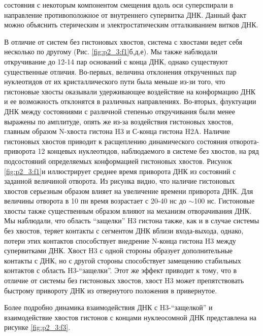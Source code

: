 состояния с некоторым компонентом смещения вдоль оси суперспирали в направление противоположное от внутреннего супервитка ДНК. Данный факт можно объяснить стерическим и электростатическим отталкиванием витков ДНК.

В отличие от систем без гистоновых хвостов, система с хвостами ведет себя несколько по другому (Рис. \ref{fig:p2_3:f1}б,д,е). Мы также наблюдали откручивание до 12-14 пар оснований с конца ДНК, однако существуют существенные отличия. Во-первых, величина отклонения открученных пар нуклеотидов от их кристаллического пути была меньше из-зи того, что гистоновые хвосты оказывали удерживающее воздействие на конформацию ДНК и ее возможность отклонятся в различных направлениях. Во-вторых, флуктуации ДНК между состояниями с различной степенью откручивания были менее выражены по амплитуде, опять же из-за воздействия гистоновых хвостов, главным образом N-хвоста гистона H3 и С-конца гистона H2A. Наличие гистоновых хвостов приводит к расщеплению динамического состояния отворота-приворота 12 концевых нуклеотидов, наблюдаемого в системе без хвостов, на ряд подсостояний определяемых конформацией гистоновых хвостов. Рисунок \ref{fig:p2_3:f1}и иллюстрирует среднее время приворота ДНК из состояний с заданной величиной отворота. Из рисунка видно, что наличие гистоновых хвостов серьезным образом влияет на увеличение времени приворота ДНК. Для величины отворота в 10 пн время возрастает с 20-40 нс до $\sim$100 нс. Гистоновые хвосты также существенным образом влияют на механизм отворачивания ДНК. Мы наблюдали, что область ``защелки'' H3 гистона также, как и в случае системы без хвостов, теряет контакты с сегментом ДНК вблизи входа-выхода, однако, потери этих контактов способствует внедрение N-конца гистона H3 между супервитками ДНК. Хвост H3 с одной стороны образует дополнительные контакты с ДНК, но с другой стороны способствует замещению стабильных контактов с область H3-``защелки''. Этот же эффект приводит к тому, что в отличие от системы без гистоновых хвостов, хвост H3 может препятствовать быстрому привороту ДНК из отвернутого положения в привернутое.

Более подробно динамика взаимодействия ДНК с H3-``защелкой'' и взаимодействие хвостов гистонов с концами нуклеосомной ДНК представлена на рисунке \ref{fig:p2_3:f3}.

